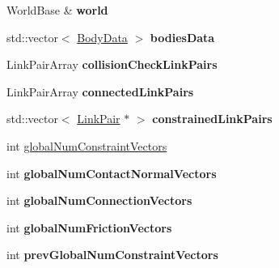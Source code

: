 \begin{DoxyCompactItemize}
\item 
\hypertarget{classOpenHRP_1_1CFSImpl_a91f20f063783e81cd4a7714cd6337af9}{World\-Base \& {\bfseries world}}\label{classOpenHRP_1_1CFSImpl_a91f20f063783e81cd4a7714cd6337af9}

\item 
\hypertarget{classOpenHRP_1_1CFSImpl_a38f66ef399ca34fa5d70ab5a720e658d}{std\-::vector$<$ \hyperlink{structOpenHRP_1_1CFSImpl_1_1BodyData}{Body\-Data} $>$ {\bfseries bodies\-Data}}\label{classOpenHRP_1_1CFSImpl_a38f66ef399ca34fa5d70ab5a720e658d}

\item 
\hypertarget{classOpenHRP_1_1CFSImpl_ae99d2756d816221237cd1c0c9bb16017}{Link\-Pair\-Array {\bfseries collision\-Check\-Link\-Pairs}}\label{classOpenHRP_1_1CFSImpl_ae99d2756d816221237cd1c0c9bb16017}

\item 
\hypertarget{classOpenHRP_1_1CFSImpl_a4be5bf5596f049fa2a1578569724f538}{Link\-Pair\-Array {\bfseries connected\-Link\-Pairs}}\label{classOpenHRP_1_1CFSImpl_a4be5bf5596f049fa2a1578569724f538}

\item 
\hypertarget{classOpenHRP_1_1CFSImpl_a361e338d994b05b3df6e95330a0ed06c}{std\-::vector$<$ \hyperlink{structOpenHRP_1_1CFSImpl_1_1LinkPair}{Link\-Pair} $\ast$ $>$ {\bfseries constrained\-Link\-Pairs}}\label{classOpenHRP_1_1CFSImpl_a361e338d994b05b3df6e95330a0ed06c}

\item 
int \hyperlink{classOpenHRP_1_1CFSImpl_aa2ce261868d0109321fd9d823aa19680}{global\-Num\-Constraint\-Vectors}
\item 
\hypertarget{classOpenHRP_1_1CFSImpl_a8ca316ad7775c2102dc35fec3e9100c7}{int {\bfseries global\-Num\-Contact\-Normal\-Vectors}}\label{classOpenHRP_1_1CFSImpl_a8ca316ad7775c2102dc35fec3e9100c7}

\item 
\hypertarget{classOpenHRP_1_1CFSImpl_a283aaa2e8110bc0c106ae8844e050ea3}{int {\bfseries global\-Num\-Connection\-Vectors}}\label{classOpenHRP_1_1CFSImpl_a283aaa2e8110bc0c106ae8844e050ea3}

\item 
\hypertarget{classOpenHRP_1_1CFSImpl_a7fcd19679c434b861bf00c59c7dc9f94}{int {\bfseries global\-Num\-Friction\-Vectors}}\label{classOpenHRP_1_1CFSImpl_a7fcd19679c434b861bf00c59c7dc9f94}

\item 
\hypertarget{classOpenHRP_1_1CFSImpl_aa54707e00a8b22a1fd1a5350edfbedb9}{int {\bfseries prev\-Global\-Num\-Constraint\-Vectors}}\label{classOpenHRP_1_1CFSImpl_aa54707e00a8b22a1fd1a5350edfbedb9}


\end{DoxyCompactItemize}
